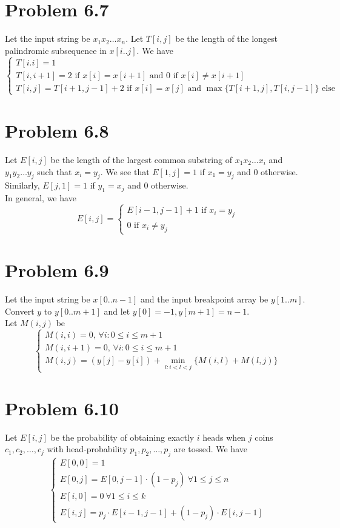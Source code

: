 \documentclass[12pt]{report}
\begin{document}
\section{Problem 6.7}
Let the input string be $x_1 x_2 \ldots x_n$. Let $T[i,j]$ be the length of the longest palindromic subsequence in $x[i..j]$. We have $$\begin{cases} T[i.i] = 1 \\ T[i,i+1] = 2 \text{ if } x[i] = x[i+1] \text{ and } 0 \text{ if } x[i] \ne x[i+1] \\ T[i,j] = T[i+1,j-1] + 2 \text{ if } x[i] = x[j] \text{ and } \max \{T[i+1,j], T[i,j-1]\} \text{ else} \end{cases}$$

\section{Problem 6.8}
Let $E[i,j]$ be the length of the largest common substring of $x_1 x_2 \ldots x_i$ and $y_1 y_2 \ldots y_j$ such that $x_i = y_j$. We see that $E[1,j] = 1$ if $x_1 = y_j$ and $0$ otherwise. Similarly, $E[j,1] = 1$ if $y_1 = x_j$ and $0$ otherwise.\\
In general, we have $$E[i,j] = \begin{cases} E[i-1,j-1] + 1 \text{ if } x_i = y_j \\ 0 \text{ if } x_i \ne y_j \end{cases}$$

\section{Problem 6.9}
Let the input string be $x[0..n-1]$ and the input breakpoint array be $y[1..m]$. Convert $y$ to $y[0..m+1]$ and let $y[0] = -1, y[m+1] = n-1$. \\
Let $M(i,j)$ be 
$$\begin{cases} M(i,i)=0\text{, }\forall i: 0 \le i \le m + 1 \\
M(i,i + 1)=0\text{, }\forall i: 0 \le i \le m + 1\\
M(i,j)=\left(y[j]-y[i]\right) + \displaystyle \min_{l: i < l < j}\{M(i,l) + M(l,j)\}
\end{cases}$$

\section{Problem 6.10}
Let $E[i,j]$ be the probability of obtaining exactly $i$ heads when $j$ coins $c_1, c_2, \ldots, c_j$ with head-probability $p_1, p_2, \ldots, p_j$ are tossed.
We have $$\begin{cases} E[0,0] = 1 \\ E[0,j] = E[0,j-1] \cdot (1-p_j) \ \forall 1 \le j \le n \\ E[i,0] = 0 \ \forall 1 \le i \le k \\ E[i,j] = p_j \cdot E[i-1,j-1] + (1-p_j) \cdot E[i,j-1] \end{cases}$$
\end{document}
